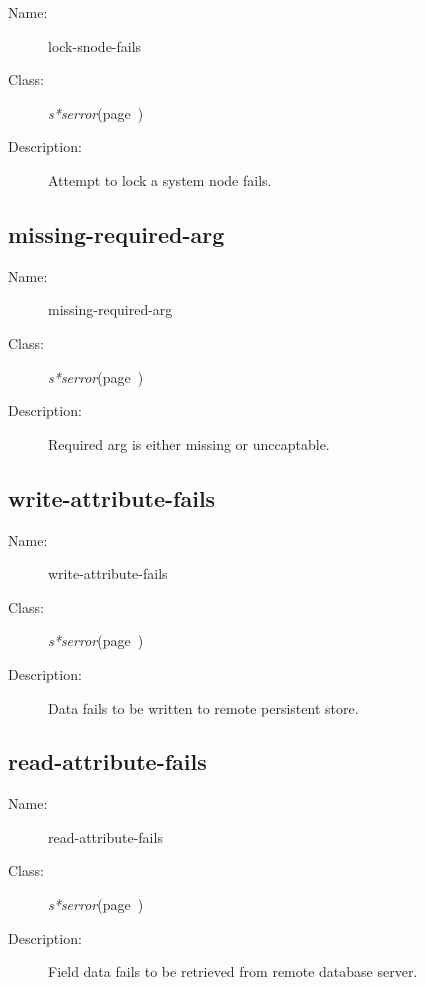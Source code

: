 \begin{description}
\item [Name:]  lock-snode-fails

\item [Class:]
{\sl s*serror}\hfill(page~\pageref{s*serror})

\item [Description:]
Attempt to lock a system node fails.


\end{description}
\horizontalline

\subsection{missing-required-arg}
\label{missing-required-arg}

\begin{description}
\item [Name:]  missing-required-arg


\item [Class:]
{\sl s*serror}\hfill(page~\pageref{s*serror})


\item [Description:] 
Required arg is either missing or unccaptable. 



\end{description}
\horizontalline

\subsection{write-attribute-fails}
\label{write-attribute-fails}

\begin{description}
\item [Name:]  write-attribute-fails


\item [Class:]
{\sl s*serror}\hfill(page~\pageref{s*serror})


\item [Description:] 
Data fails to be written to remote persistent store.


\end{description}
\horizontalline

\subsection{read-attribute-fails}
\label{read-attribute-fails}

\begin{description}

\item [Name:]  read-attribute-fails


\item [Class:]
{\sl s*serror}\hfill(page~\pageref{s*serror})


\item [Description:] 
Field data fails to be retrieved from remote database
server.



\end{description}
\horizontalline

